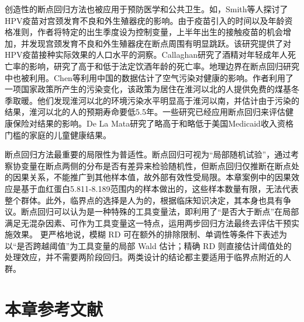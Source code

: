 \documentclass[
  chinese-hans,
  letterpaper,
  DIV=11,
  numbers=noendperiod]{scrreprt}
\begin{document}
创造性的断点回归方法也被应用于预防医学和公共卫生。如，Smith等人探讨了HPV疫苗对宫颈发育不良和外生殖器疣的影响。由于疫苗引入的时间以及年龄资格准则，作者将特定的出生季度设为控制变量，上半年出生的接触疫苗的机会增加，并发现宫颈发育不良和外生殖器疣在断点周围有明显跳跃。该研究提供了对HPV疫苗接种实际效果的人口水平的洞察。Callaghan研究了酒精对年轻成年人死亡率的影响，研究了高于和低于法定饮酒年龄的死亡率。地理边界在断点回归研究中也被利用。Chen等利用中国的数据估计了空气污染对健康的影响。作者利用了一项国家政策所产生的污染变化，该政策为居住在淮河以北的人提供免费的煤基冬季取暖。他们发现淮河以北的环境污染水平明显高于淮河以南，并估计由于污染的结果，淮河以北的人的预期寿命要低5.5年。一些研究已经应用断点回归来评估健康保险对结果的影响。De
La
Mata研究了略高于和略低于美国Medicaid收入资格门槛的家庭的儿童健康结果。

断点回归方法最重要的局限性为普适性。断点回归可视为``局部随机试验''，通过考察协变量在断点两侧的分布是否有差异来检验随机性，但断点回归仅推断在断点处的因果关系，不能推广到其他样本值，故外部有效性受局限。本章案例中的因果效应是基于血红蛋白5.811-8.189范围内的样本做出的，这些样本数量有限，无法代表整个群体。此外，临界点的选择是人为的，根据临床知识决定，其本身也具有争议。断点回归可以认为是一种特殊的工具变量法，即利用了``是否大于断点''在局部满足无混杂因素、可作为工具变量这一特点，运用两步回归方法最终去评估干预实施效果。
更严格地说，模糊 RD
可在额外的排除限制、单调性等条件下表述为以``是否跨越阈值''为工具变量的局部
Wald 估计；精确 RD
则直接估计阈值处的处理效应，并不需要两阶段回归。两类设计的结论都主要适用于临界点附近的人群。

\section{本章参考文献}\label{ux672cux7ae0ux53c2ux8003ux6587ux732e-1}
\end{document}
